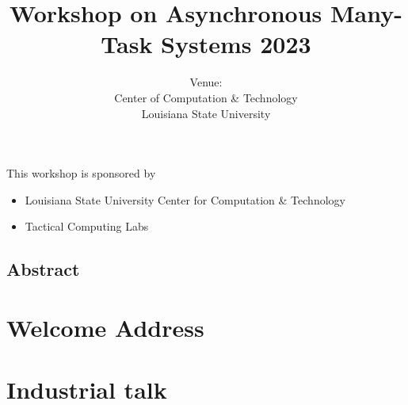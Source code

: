 \documentclass[12pt,letterpaper]{book}
\title{Workshop on Asynchronous Many-Task Systems 2023}
\author{Venue: \\ Center of Computation \& Technology \\ Louisiana State University}
\newenvironment{conf-abstract}[4][]{
 \needspace{10\baselineskip}
 \begin{center}
 { \renewcommand\textsuperscript[1]{}
 \phantomsection\addcontentsline{toc}{section}
 {\texorpdfstring{#2 (\emph{#3})}{#2 (#3)}}
 }
 {{\large\bfseries #2}\marginnote{#1}\par}
 \medskip
 {#3\par}
 \smallskip
 {\small #4\par}
 \end{center}
}{%
 \bigskip
 \hrule
 \bigskip
}
\begin{document}
\frontmatter

\maketitle

This workshop is sponsored by

\begin{itemize}
\item Louisiana State University Center for Computation \& Technology 
\item Tactical Computing Labs
\end{itemize}

\newpage

\section*{Abstract}


\chapter{Welcome Address}



%

\newpage



\tableofcontents

\mainmatter

\chapter{Industrial talk}

\end{document}
